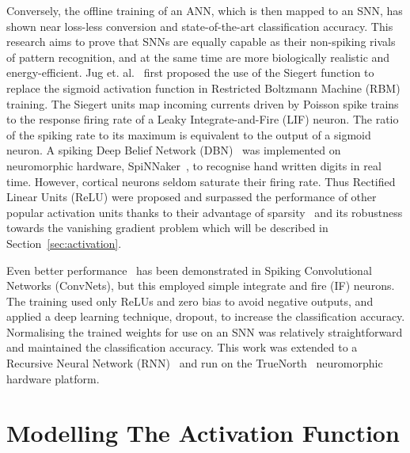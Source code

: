 
Conversely, the offline training of an ANN, which is then mapped to an SNN, has shown near loss-less conversion and state-of-the-art classification accuracy.
This research aims to prove that SNNs are equally capable as their non-spiking rivals of pattern recognition, and at the same time are more biologically realistic and energy-efficient.
Jug et. al.~\cite{Jug_etal_2012} first proposed the use of the Siegert function to replace the sigmoid activation function in Restricted Boltzmann Machine (RBM) training.
The Siegert units map incoming currents driven by Poisson spike trains to the response firing rate of a Leaky Integrate-and-Fire (LIF) neuron.
The ratio of the spiking rate to its maximum is equivalent to the output of a sigmoid neuron.
A spiking Deep Belief Network (DBN)~\cite{Stromatias2015scalable} was implemented on neuromorphic hardware, SpiNNaker~\cite{furber2014spinnaker}, to recognise hand written digits in real time.
However, cortical neurons seldom saturate their firing rate.
Thus Rectified Linear Units (ReLU) were proposed and surpassed the performance of other popular activation units thanks to their advantage of sparsity~\cite{glorot2011deep} and its robustness towards the vanishing gradient problem which will be described in Section~\ref{sec:activation}.

Even better performance~\cite{cao2015spiking,diehl2015fast} has been demonstrated in Spiking Convolutional Networks (ConvNets), but this employed simple integrate and fire (IF) neurons.
The training used only ReLUs and zero bias to avoid negative outputs, and applied a deep learning technique, dropout, to increase the classification accuracy.
Normalising the trained weights for use on an SNN was relatively straightforward and maintained the classification accuracy.
This work was extended to a Recursive Neural Network (RNN)~\cite{diehl2016conversion} and run on the TrueNorth~\cite{merolla2014million} neuromorphic hardware platform.


	
\section{Modelling The Activation Function}


